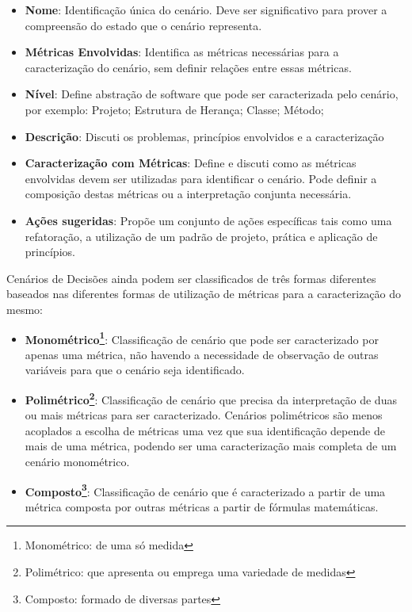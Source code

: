 \begin{itemize}
\item \textbf{Nome}: Identificação única do cenário. Deve ser significativo para prover a compreensão do estado que o cenário representa.
\item \textbf{Métricas Envolvidas}: Identifica as métricas necessárias para a caracterização do cenário, sem definir relações entre essas métricas.
\item \textbf{Nível}: Define abstração de software que pode ser caracterizada pelo cenário, por exemplo: Projeto; Estrutura de Herança; Classe; Método;
\item \textbf{Descrição}: Discuti os problemas, princípios envolvidos e a caracterização
\item \textbf{Caracterização com Métricas}: Define e discuti como as métricas envolvidas devem ser utilizadas para identificar o cenário. Pode definir a composição destas métricas ou a interpretação conjunta necessária.
\item \textbf{Ações sugeridas}: Propõe um conjunto de ações específicas tais como uma refatoração, a utilização de um padrão de projeto, prática e aplicação de princípios.
\end{itemize}

%

Cenários de Decisões ainda podem ser classificados de três formas diferentes baseados nas diferentes formas de utilização de métricas para a caracterização do mesmo:

\begin{itemize}
\item \textbf{Monométrico\footnote{Monométrico: de uma só medida}}: Classificação de cenário que pode ser caracterizado por apenas uma métrica, não havendo a necessidade de observação de outras variáveis para que o cenário seja identificado.
\item \textbf{Polimétrico\footnote{Polimétrico: que apresenta ou emprega uma variedade de medidas}}: Classificação de cenário que precisa da interpretação de duas ou mais métricas para ser caracterizado. Cenários polimétricos são menos acoplados a escolha de métricas uma vez que sua identificação depende de mais de uma métrica, podendo ser uma caracterização mais completa de um cenário monométrico. 
\item \textbf{Composto\footnote{Composto: formado de diversas partes}}: Classificação de cenário que é caracterizado a partir de uma métrica composta por outras métricas a partir de fórmulas matemáticas.
\end{itemize}


